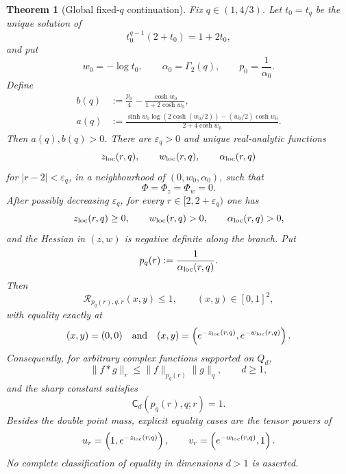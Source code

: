 \documentclass[11pt,reqno]{amsart}
\numberwithin{equation}{section}
\newtheorem{theorem}{Theorem}[section]
\theoremstyle{definition}
\theoremstyle{remark}
\newcommand{\Cpqr}{\mathsf C}
\begin{document}
\begin{theorem}[Global fixed-$q$ continuation]\label{thm:fixed-q-global}
Fix $q\in(1,4/3)$.  Let $t_0=t_q$ be the unique solution of
\begin{equation}\label{eq:t0-local}
  t_0^{q-1}(2+t_0)=1+2t_0,
\end{equation}
and put
\[
  w_0=-\log t_0,
  \qquad
  \alpha_0=\Gamma_2(q),
  \qquad
  p_0=\frac1{\alpha_0}.
\]
Define
\begin{align}
  b(q)
  &:= \frac{p_0}{4}-\frac{\cosh w_0}{1+2\cosh w_0},\label{eq:b-def}\\
  a(q)
  &:=
  \frac{\sinh w_0\log(2\cosh(w_0/2))-(w_0/2)\cosh w_0}
  {2+4\cosh w_0}.
  \label{eq:a-def}
\end{align}
Then $a(q),b(q)>0$.  There are $\varepsilon_q>0$ and unique real-analytic functions
\[
  z_{\rm loc}(r,q),\qquad
  w_{\rm loc}(r,q),\qquad
  \alpha_{\rm loc}(r,q)
\]
for $|r-2|<\varepsilon_q$, in a neighbourhood of
$(0,w_0,\alpha_0)$, such that
\begin{equation}\label{eq:local-system}
  \Phi=\Phi_z=\Phi_w=0.
\end{equation}
After possibly decreasing $\varepsilon_q$, for every
$r\in[2,2+\varepsilon_q)$ one has
\[
  z_{\rm loc}(r,q)\ge0,\qquad
  w_{\rm loc}(r,q)>0,\qquad
  \alpha_{\rm loc}(r,q)>0,
\]
and the Hessian in $(z,w)$ is negative definite along the branch.  Put
\[
  p_q(r):=\frac1{\alpha_{\rm loc}(r,q)}.
\]
Then
\begin{equation}\label{eq:fixed-q-global-ratio}
  \mathcal R_{p_q(r),q,r}(x,y)\le1,
  \qquad (x,y)\in[0,1]^2,
\end{equation}
with equality exactly at
\begin{equation}\label{eq:fixed-q-equality-set}
  (x,y)=(0,0)
  \quad\text{and}\quad
  (x,y)=
  \left(e^{-z_{\rm loc}(r,q)},e^{-w_{\rm loc}(r,q)}\right).
\end{equation}
Consequently, for arbitrary complex functions supported on $Q_d$,
\begin{equation}\label{eq:fixed-q-global-d}
  \|f*g\|_r
  \le\|f\|_{p_q(r)}\|g\|_q,
  \qquad d\ge1,
\end{equation}
and the sharp constant satisfies
\[
  \Cpqr_d(p_q(r),q;r)=1.
\]
Besides the double point mass, explicit
equality cases are the tensor powers of
\begin{equation}\label{eq:fixed-q-tensor-factors}
  u_r=\left(1,e^{-z_{\rm loc}(r,q)}\right),
  \qquad
  v_r=\left(e^{-w_{\rm loc}(r,q)},1\right).
\end{equation}
No complete classification of equality in dimensions $d>1$ is asserted.


\end{theorem}
\end{document}
